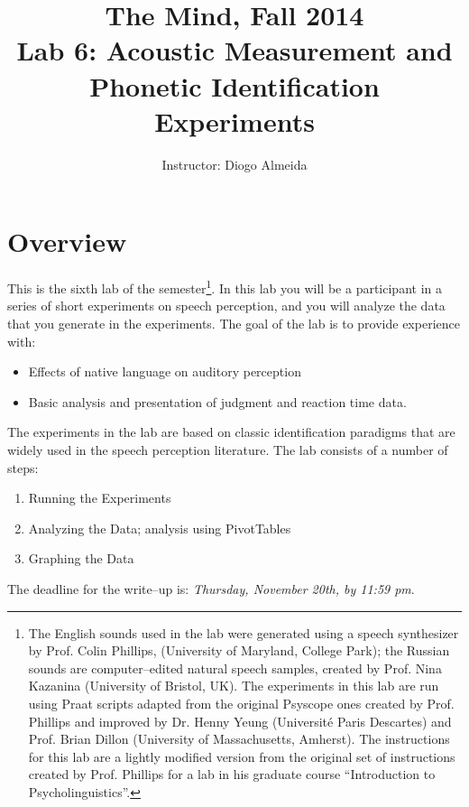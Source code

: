 \documentclass{article}
\title{The Mind, Fall 2014\\ Lab 6: Acoustic Measurement and Phonetic Identification Experiments}
\author{Instructor: Diogo Almeida}
\newcommand{\soft}[1]{\textsf{#1}}
\newcommand{\Praat}{\soft{Praat}}
\newcommand{\PsyX}{\soft{Psyscope}}
\newcommand{\deadline}{\emph{Thursday, November 20th, by 11:59 pm}}
\begin{document}
\maketitle

\tableofcontents
\newpage
\listoffigures
\newpage
\section{Overview}

This is the sixth lab of the semester\footnote{The English sounds used in the lab were generated using a speech synthesizer by Prof. Colin Phillips, (University of Maryland, College Park); the Russian sounds are computer--edited natural speech samples, created by Prof. Nina Kazanina (University of Bristol, UK). The experiments in this lab are run using \Praat{} scripts adapted from the original \PsyX{} ones created by Prof. Phillips and improved by Dr. Henny Yeung (Universit\'{e} Paris Descartes) and Prof. Brian Dillon (University of Massachusetts, Amherst). The instructions for this lab are a lightly modified version from the original set of instructions created by Prof. Phillips for a lab in his graduate course ``Introduction to Psycholinguistics''.}. In this lab you will be a participant in a series of short experiments on speech perception, and you will analyze the data that you generate in the experiments. The goal of the lab is to provide experience with:

\begin{itemize}
\item Effects of native language on auditory perception
\item Basic analysis and presentation of judgment and reaction time data.
\end{itemize}

The experiments in the lab are based on classic identification paradigms that are widely used in the speech perception literature. The lab consists of a number of steps:

\begin{enumerate}
\item Running the Experiments
\item Analyzing the Data; analysis using PivotTables
\item Graphing the Data
\end{enumerate}

The deadline for the write--up is: \deadline{}.
\end{document}
